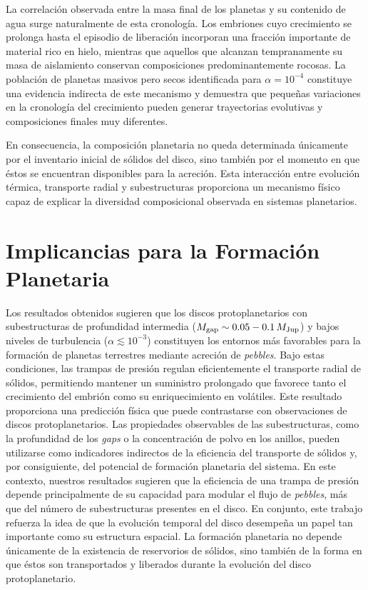 La correlación observada entre la masa final de los planetas y su contenido de agua surge naturalmente de esta cronología. Los embriones cuyo crecimiento se prolonga hasta el episodio de liberación incorporan una fracción importante de material rico en hielo, mientras que aquellos que alcanzan tempranamente su masa de aislamiento conservan composiciones predominantemente rocosas. La población de planetas masivos pero secos identificada para $\alpha=10^{-4}$ constituye una evidencia indirecta de este mecanismo y demuestra que pequeñas variaciones en la cronología del crecimiento pueden generar trayectorias evolutivas y composiciones finales muy diferentes.

En consecuencia, la composición planetaria no queda determinada únicamente por el inventario inicial de sólidos del disco, sino también por el momento en que éstos se encuentran disponibles para la acreción. Esta interacción entre evolución térmica, transporte radial y subestructuras proporciona un mecanismo físico capaz de explicar la diversidad composicional observada en sistemas planetarios.


\section{Implicancias para la Formación Planetaria} 

Los resultados obtenidos sugieren que los discos protoplanetarios con subestructuras de profundidad intermedia ($M_{\rm gap}\sim0.05-0.1\,M_{\rm Jup}$) y bajos niveles de turbulencia ($\alpha\lesssim10^{-3}$) constituyen los entornos más favorables para la formación de planetas terrestres mediante acreción de \textit{pebbles}. Bajo estas condiciones, las trampas de presión regulan eficientemente el transporte radial de sólidos, permitiendo mantener un suministro prolongado que favorece tanto el crecimiento del embrión como su enriquecimiento en volátiles. Este resultado proporciona una predicción física que puede contrastarse con observaciones de discos protoplanetarios. Las propiedades observables de las subestructuras, como la profundidad de los \textit{gaps} o la concentración de polvo en los anillos, pueden utilizarse como indicadores indirectos de la eficiencia del transporte de sólidos y, por consiguiente, del potencial de formación planetaria del sistema. En este contexto, nuestros resultados sugieren que la eficiencia de una trampa de presión depende principalmente de su capacidad para modular el flujo de \textit{pebbles}, más que del número de subestructuras presentes en el disco. En conjunto, este trabajo refuerza la idea de que la evolución temporal del disco desempeña un papel tan importante como su estructura espacial. La formación planetaria no depende únicamente de la existencia de reservorios de sólidos, sino también de la forma en que éstos son transportados y liberados durante la evolución del disco protoplanetario.

